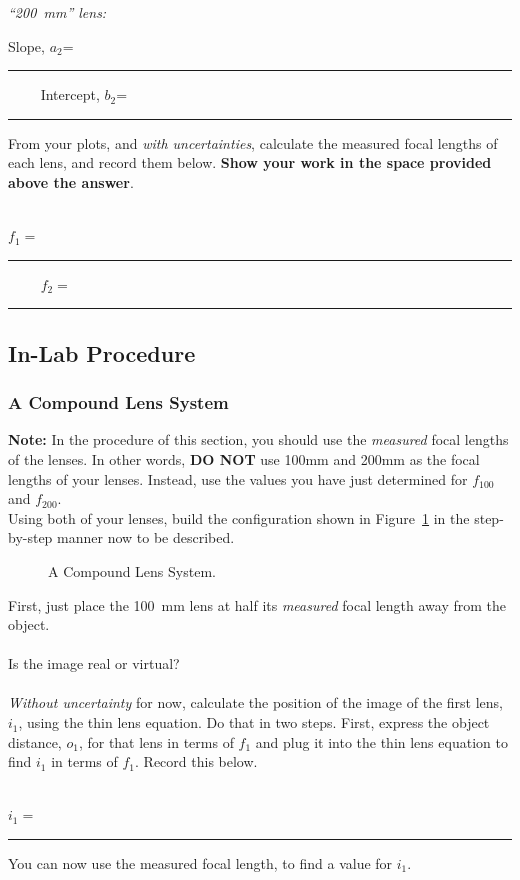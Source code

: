 \noindent
{\it ``200~mm'' lens:}
\begin{center}
Slope, $a_2$=~\rule{3cm}{.1mm} ~~~~
Intercept, $b_2$=~\rule{3cm}{.1mm}
\end{center}
\vspace*{.5cm}

\noindent From your plots,  and {\it with uncertainties}, 
calculate the measured focal lengths of
each lens, and record them below. {\bf Show your work in the space provided 
above the answer}. \\
\vspace*{2cm}\\
\begin{center}
$f_1=$~\rule{3cm}{.1mm} ~~~~
$f_2=$~\rule{3cm}{.1mm}
\end{center}

\subsection{In-Lab Procedure}

\subsubsection{A Compound Lens System} 
{\bf Note:} In the procedure of this section, you should use the {\it measured}
focal lengths of the lenses. In other words, {\bf DO NOT} use 100mm and 200mm
as the focal lengths of your lenses. Instead, use the values you have just
determined for $f_{100}$ and $f_{200}.$\\ 

\noindent Using both of your lenses, build the configuration shown in 
Figure~\ref{fig:opt:compoundlens} in the step-by-step manner now to be 
described.\\ 

\begin{figure}[htb]
\centerline{\epsfxsize=9.5cm }
\caption{A Compound Lens System.}
\label{fig:opt:compoundlens}
\end{figure}

\noindent First, just place the 100~mm lens at half its {\it measured} focal 
length away from the 
object.\\
\ \\
\noindent Is the image real or virtual? \\
\ \\
\noindent
{\it Without uncertainty} for now,  calculate the position of the image of the
first lens, $i_1$, using the thin lens equation. Do that in two steps. First,
express the object distance, $o_1$, for that lens in terms of $f_1$ and plug it
into the thin lens equation to find $i_1$ in terms of $f_1$. Record this
below. \\
\vspace*{2cm} \\
\begin{center}
$i_1=$~\rule{3cm}{.1mm}
\end{center}
\vspace*{.5cm}
\noindent You can now use the measured focal length, to find a value for $i_1$.

